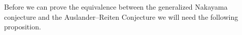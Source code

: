 %
%
%

Before we can prove the equivalence between the generalized Nakayama conjecture and the Auslander--Reiten Conjecture we will need the following proposition.

